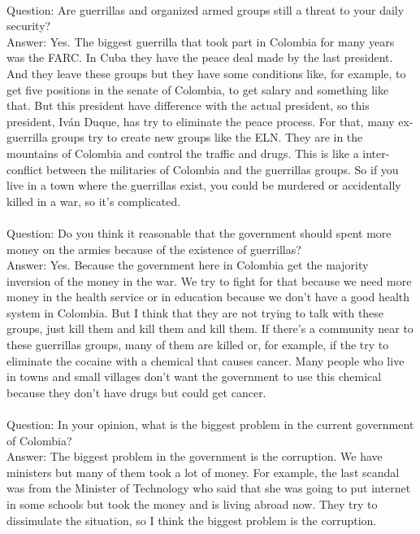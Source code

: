 \documentclass{phyasgn}\usepackage{nag}
\begin{document}
\\
Question: Are guerrillas and organized armed groups still a threat to your daily security?\\
Answer: Yes. The biggest guerrilla that took part in Colombia for many years was the FARC. In Cuba they have the peace deal made by the last president. And they leave these groups but they have some conditions like, for example, to get five positions in the senate of Colombia, to get salary and something like that. But this president have difference with the actual president, so this president, Iván Duque, has try to eliminate the peace process. For that, many ex-guerrilla groups try to create new groups like the ELN. They are in the mountains of Colombia and control the traffic and drugs. This is like a inter-conflict between the militaries of Colombia and the guerrillas groups. So if you live in a town where the guerrillas exist, you could be murdered or accidentally killed in a war, so it’s complicated.\\
\\
Question: Do you think it reasonable that the government should spent more money on the armies because of the existence of guerrillas?\\
Answer: Yes. Because the government here in Colombia get the majority inversion of the money in the war. We try to fight for that because we need more money in the health service or in education because we don’t have a good health system in Colombia. But I think that they are not trying to talk with these groups, just kill them and kill them and kill them. If there’s a community near to these guerrillas groups, many of them are killed or, for example, if the try to eliminate the cocaine with a chemical that causes cancer. Many people who live in towns and small villages don’t want the government to use this chemical because they don’t have drugs but could get cancer. \\
\\
Question: In your opinion, what is the biggest problem in the current government of Colombia?\\
Answer: The biggest problem in the government is the corruption. We have ministers but many of them took a lot of money. For example, the last scandal was from the Minister of Technology who said that she was going to put internet in some schools but took the money and is living abroad now. They try to dissimulate the situation, so I think the biggest problem is the corruption.\\
\\
\end{document}
